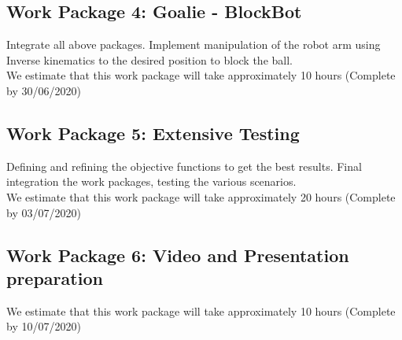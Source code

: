 \documentclass[12pt,pdftex,a4paper]{article}
\begin{document}
\subsection*{Work Package 4: Goalie - BlockBot}
Integrate all above packages.
Implement manipulation of the robot arm using Inverse kinematics to the desired position to block the ball. \\
$ $ \\
We estimate that this work package will take approximately 10 hours (Complete by 30/06/2020)

\subsection*{Work Package 5: Extensive Testing}
Defining and refining the objective functions to get the best results.
Final integration the work packages, testing the various scenarios. \\
$ $ \\
We estimate that this work package will take approximately 20 hours (Complete by 03/07/2020)

\subsection*{Work Package 6: Video and Presentation preparation}
We estimate that this work package will take approximately 10 hours (Complete by 10/07/2020)

\end{document}
